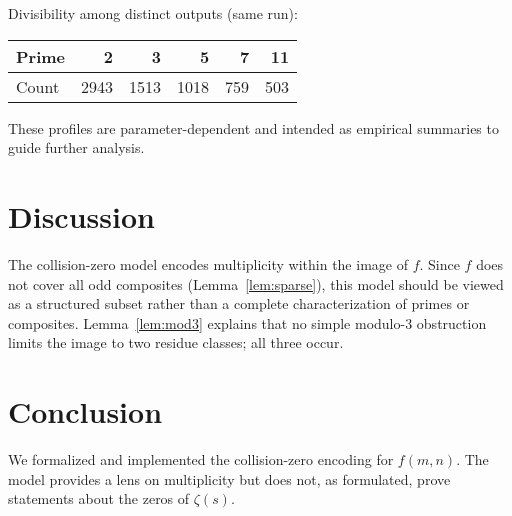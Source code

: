 \documentclass[12pt,a4paper]{article}
\begin{document}
Divisibility among distinct outputs (same run):
\begin{center}
\begin{tabular}{l|rrrrr}
Prime & 2 & 3 & 5 & 7 & 11 \\
\hline
Count & 2943 & 1513 & 1018 & 759 & 503 \\
\end{tabular}
\end{center}

These profiles are parameter-dependent and intended as empirical summaries to guide further analysis.

\section{Discussion}
The collision-zero model encodes multiplicity within the image of \(f\). Since \(f\) does not cover all odd composites (Lemma~\ref{lem:sparse}), this model should be viewed as a structured subset rather than a complete characterization of primes or composites. Lemma~\ref{lem:mod3} explains that no simple modulo-3 obstruction limits the image to two residue classes; all three occur.

\section{Conclusion}
We formalized and implemented the collision-zero encoding for \(f(m,n)\). The model provides a lens on multiplicity but does not, as formulated, prove statements about the zeros of \(\zeta(s)\).
\end{document}

